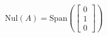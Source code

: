 \documentclass[preview]{standalone}
\begin{document}
\begin{align*}
\text{Nul}(A)  = \text{Span}\left(\begin{bmatrix} 0 \\ 1 \\ 0 \end{bmatrix}\right)
\end{align*}
\end{document}
